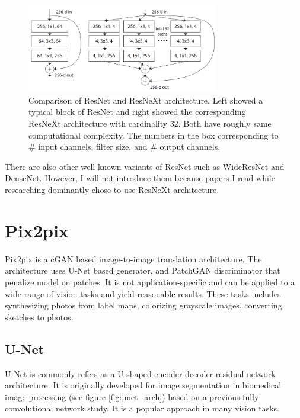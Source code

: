 \begin{figure}
    \centering
    \includegraphics[width=0.75\textwidth]{images/preliminary/resnet_resnext_cmp.png}
    \caption{Comparison of ResNet and ResNeXt architecture. Left showed a typical block of ResNet and right showed the corresponding ResNeXt architecture with cardinality \= 32. Both have roughly same computational complexity. The numbers in the box corresponding to \# input channels, filter size, and \# output channels.\cite{xieAggregatedResidualTransformations2017a}} 
    \label{fig:resnet_resnext_cmp}
\end{figure}

There are also other well-known variants of ResNet such as WideResNet and DenseNet. However, I will not introduce them because papers I read while researching dominantly chose to use ResNeXt architecture.



\section{Pix2pix}
Pix2pix is a cGAN based image-to-image translation architecture. The architecture uses U-Net based generator, and PatchGAN discriminator that penalize model on patches. It is not application-specific and can be applied to a wide range of vision tasks and yield reasonable results. These tasks includes synthesizing photos from label maps, colorizing grayscale images, converting sketches to photos.

\subsection{U-Net}
U-Net\cite{ronnebergerUNetConvolutionalNetworks2015} is commonly refers as a U-shaped encoder-decoder residual network architecture. It is originally developed for image segmentation in biomedical image processing (see figure \ref{fig:unet_arch}) based on a previous fully convolutional network study\cite{longFullyConvolutionalNetworks2015}. It is a popular approach in many vision tasks.

